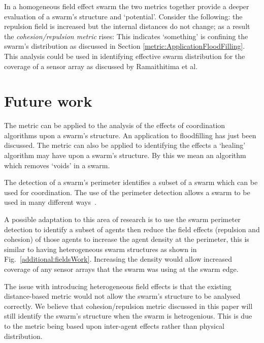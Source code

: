\documentclass{ieeeaccess}
\begin{document}
In a homogeneous field effect swarm the two metrics together provide a deeper evaluation of a swarm's structure and `potential'. Consider the following: the repulsion field is increased but the internal distances do not change; as a result the \emph{cohesion/repulsion metric} rises: This indicates `something' is confining the swarm's distribution as discussed in Section \ref{metric:ApplicationFloodFilling}. This analysis could be used in identifying effective swarm distribution for the coverage of a sensor array as discussed by Ramaithitima et al.~\cite{RWBK:15}


\section{Future work\label{metric:Future}}
The metric can be applied to the analysis of the effects of coordination algorithms upon a swarm's structure. An application to floodfilling has just been discussed. The metric can also be applied to identifying the effects a `healing' algorithm may have upon a swarm's structure. By this we mean an algorithm which removes `voids' in a swarm.

The detection of a swarm's perimeter \cite{MD:09, MJ:08, ZAPS:07, JG:13} identifies a subset of a swarm which can be used for coordination. The use of the perimeter detection allows a swarm to be used in many different ways~\cite{ZFG:13, AKK:08, APZDAMC:09, AZDPS:11}. 

A possible adaptation to this area of research is to use the swarm perimeter detection to identify a subset of agents then reduce the field effects (repulsion and cohesion) of those agents to increase the agent density at the perimeter, this is similar to having heterogeneous swarm structures as shown in Fig.~\ref{additional:fieldsWork}. Increasing the density would allow increased coverage of any sensor arrays that the swarm was using at the swarm edge. 

The issue with introducing heterogeneous field effects is that the existing distance-based metric would not allow the swarm's structure to be analysed correctly. We believe that cohesion/repulsion metric discussed in this paper will still identify the swarm's structure when the swarm is hetrogenious. This is due to the metric being based upon inter-agent effects rather than physical distribution. 
\end{document}
